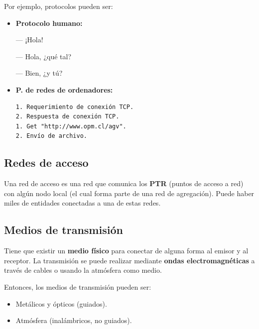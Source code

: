 \documentclass[a4paper]{book}
\begin{document}
Por ejemplo, protocolos pueden ser:
\begin{multicols}{3}
  \begin{itemize}
    \item \textbf{Protocolo humano:}

           --- ¡Hola!

           --- Hola, ¿qué tal?

           --- Bien, ¿y tú?
  \end{itemize}
  \columnbreak
  \begin{itemize}
    \item \textbf{P. de redes de ordenadores:}
          \begin{verbatim}
1. Requerimiento de conexión TCP.
2. Respuesta de conexión TCP.
1. Get "http://www.opm.cl/agv".
2. Envío de archivo.
\end{verbatim}
  \end{itemize}
  \columnbreak
\end{multicols}

\subsection{Redes de acceso}
Una red de acceso es una red que comunica los \textbf{PTR} (puntos de acceso a red) con algún nodo local (el cual forma parte de una red de agregación). Puede haber miles de entidades conectadas a una de estas redes.

\subsection{Medios de transmisión}
Tiene que existir un \textbf{medio físico} para conectar de alguna forma al emisor y al receptor. La transmisión se puede realizar mediante \textbf{ondas electromagnéticas} a través de cables o usando la atmósfera como medio.

Entonces, los medios de transmisión pueden ser:
\begin{itemize}
  \item Metálicos y ópticos (guiados).
  \item Atmósfera (inalámbricos, no guiados).
\end{itemize}
\end{document}
